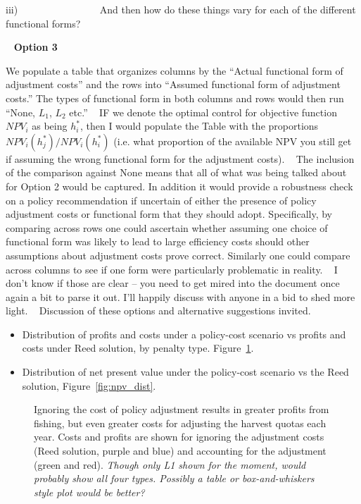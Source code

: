 \documentclass[authoryear, review, 12pt]{elsarticle}
\newcommand{\cdb}[1]{{\it \color{darkgreen} #1}}
\begin{document}
{  iii)                 And then how do these things vary for each of the different functional forms?

   
  \textbf{Option 3}


  We populate a table that organizes columns by the ``Actual functional form of adjustment costs'' and the rows into ``Assumed functional form of adjustment costs.'' The types of functional form in both columns and rows would then run ``None, $L_1$, $L_2$ etc.''
   
  IF we denote the optimal control for objective function $NPV_i$ as being $h^*_i$, then I would populate the Table with the proportions
  $NPV_i(h^*_j) / NPV_i(h^*_i)$
  (i.e. what proportion of the available NPV you still get if assuming the wrong functional form for the adjustment costs).
   
  The inclusion of the comparison against None means that all of what was being talked about for Option 2 would be captured. In addition it would provide a robustness check on a policy recommendation if uncertain of either the presence of policy adjustment costs or functional form that they should adopt. Specifically, by comparing across rows one could ascertain whether assuming one choice of functional form was likely to lead to large efficiency costs should other assumptions about adjustment costs prove correct. Similarly one could compare across columns to see if one form were particularly problematic in reality.
   
  I don’t know if those are clear – you need to get mired into the document once again a bit to parse it out. I’ll happily discuss with anyone in a bid to shed more light.
   
  Discussion of these options and alternative suggestions invited.
}



\begin{itemize}
  \item Distribution of profits and costs under a policy-cost scenario vs profits and costs under Reed solution, by penalty type. Figure~\ref{fig:profits_costs}.
  \item Distribution of net present value under the policy-cost scenario vs the Reed solution, Figure~\ref{fig:npv_dist}.  
\end{itemize}

\begin{figure}
  \begin{center}
    \caption{Ignoring the cost of policy adjustment results in greater profits from fishing, but even greater costs for adjusting the harvest quotas each year.  Costs and profits are shown for ignoring the adjustment costs (Reed solution, purple and blue) and accounting for the adjustment (green and red).  \cdb{Though only L1 shown for the moment, would probably show all four types.  Possibly a table or box-and-whiskers style plot would be better?}}\label{fig:profits_costs}
  \end{center}
\end{figure}
\end{document}
